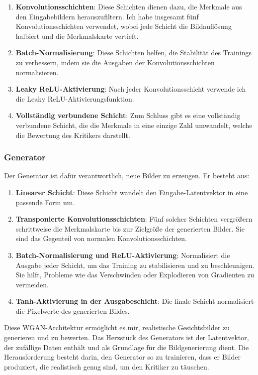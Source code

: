 \documentclass[a4paper, 12pt]{article}
\begin{document}
\begin{enumerate}
    \item \textbf{Konvolutionsschichten}: Diese Schichten dienen dazu, die Merkmale aus den Eingabebildern herauszufiltern. Ich habe insgesamt fünf Konvolutionsschichten verwendet, wobei jede Schicht die Bildauflösung halbiert und die Merkmalskarte vertieft.
    \item \textbf{Batch-Normalisierung}: Diese Schichten helfen, die Stabilität des Trainings zu verbessern, indem sie die Ausgaben der Konvolutionsschichten normalisieren.
    \item \textbf{Leaky ReLU-Aktivierung}: Nach jeder Konvolutionsschicht verwende ich die Leaky ReLU-Aktivierungsfunktion.
    \item \textbf{Vollständig verbundene Schicht}: Zum Schluss gibt es eine vollständig verbundene Schicht, die die Merkmale in eine einzige Zahl umwandelt, welche die Bewertung des Kritikers darstellt.
\end{enumerate}

\subsubsection{Generator}

Der Generator ist dafür verantwortlich, neue Bilder zu erzeugen. Er besteht aus:

\begin{enumerate}
    \item \textbf{Linearer Schicht}: Diese Schicht wandelt den Eingabe-Latentvektor in eine passende Form um.
    \item \textbf{Transponierte Konvolutionsschichten}: Fünf solcher Schichten vergrößern schrittweise die Merkmalskarte bis zur Zielgröße der generierten Bilder. Sie sind das Gegenteil von normalen Konvolutionsschichten.
    \item \textbf{Batch-Normalisierung und ReLU-Aktivierung}: Normalisiert die Ausgabe jeder Schicht, um das Training zu stabilisieren und zu beschleunigen. Sie hilft, Probleme wie das Verschwinden oder Explodieren von Gradienten zu vermeiden.
    \item \textbf{Tanh-Aktivierung in der Ausgabeschicht}: Die finale Schicht normalisiert die Pixelwerte des generierten Bildes.
\end{enumerate}

Diese WGAN-Architektur ermöglicht es mir, realistische Gesichtsbilder zu generieren und zu bewerten. Das Herzstück des Generators ist der Latentvektor, der zufällige Daten enthält und als Grundlage für die Bildgenerierung dient. Die Herausforderung besteht darin, den Generator so zu trainieren, dass er Bilder produziert, die realistisch genug sind, um den Kritiker zu täuschen.
\end{document}
